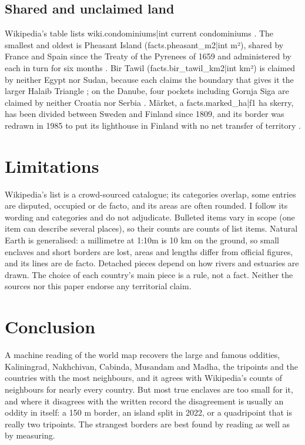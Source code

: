 \documentclass[11pt,a4paper]{article}
\begin{document}
\subsection{Shared and unclaimed land}
Wikipedia's table lists {{wiki.condominiums|int}} current condominiums \citep{wcondo}. The smallest and oldest is Pheasant Island ({{facts.pheasant_m2|int}} m²), shared by France and Spain since the Treaty of the Pyrenees of 1659 and administered by each in turn for six months \citep{wpheasant}. Bir Tawil ({{facts.bir_tawil_km2|int}} km²) is claimed by neither Egypt nor Sudan, because each claims the boundary that gives it the larger Halaib Triangle \citep{wbir}; on the Danube, four pockets including Gornja Siga are claimed by neither Croatia nor Serbia \citep{wnullius}. Märket, a {{facts.marked_ha|f1}} ha skerry, has been divided between Sweden and Finland since 1809, and its border was redrawn in 1985 to put its lighthouse in Finland with no net transfer of territory \citep{wmarket}.

\section{Limitations}
Wikipedia's list is a crowd-sourced catalogue; its categories overlap, some entries are disputed, occupied or de facto, and its areas are often rounded. I follow its wording and categories and do not adjudicate. Bulleted items vary in scope (one item can describe several places), so their counts are counts of list items. Natural Earth is generalised: a millimetre at 1:10m is 10 km on the ground, so small enclaves and short borders are lost, areas and lengths differ from official figures, and its lines are de facto. Detached pieces depend on how rivers and estuaries are drawn. The choice of each country's main piece is a rule, not a fact. Neither the sources nor this paper endorse any territorial claim.

\section{Conclusion}
A machine reading of the world map recovers the large and famous oddities, Kaliningrad, Nakhchivan, Cabinda, Musandam and Madha, the tripoints and the countries with the most neighbours, and it agrees with Wikipedia's counts of neighbours for nearly every country. But most true enclaves are too small for it, and where it disagrees with the written record the disagreement is usually an oddity in itself: a 150 m border, an island split in 2022, or a quadripoint that is really two tripoints. The strangest borders are best found by reading as well as by measuring.
\end{document}
